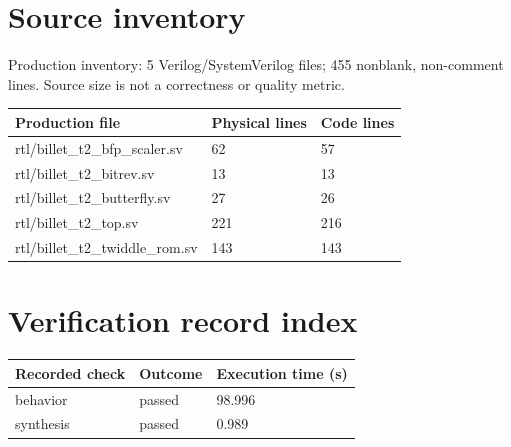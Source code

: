 \documentclass[11pt,a4paper]{article}
\begin{document}
\appendix\section{Source inventory}

Production inventory: 5 Verilog/\allowbreak{}SystemVerilog files; 455 nonblank,\allowbreak{} non-comment lines. Source size is not a correctness or quality metric.

{\small\renewcommand{\arraystretch}{1.18}\begin{longtable}{@{}L{0.61\textwidth}L{0.15\textwidth}L{0.15\textwidth}@{}}\toprule

\textbf{Production file} & \textbf{Physical lines} & \textbf{Code lines}\\\midrule\endhead

rtl/\allowbreak{}billet\_\allowbreak{}t2\_\allowbreak{}bfp\_\allowbreak{}scaler.sv & 62 & 57\\[3pt]

rtl/\allowbreak{}billet\_\allowbreak{}t2\_\allowbreak{}bitrev.sv & 13 & 13\\[3pt]

rtl/\allowbreak{}billet\_\allowbreak{}t2\_\allowbreak{}butterfly.sv & 27 & 26\\[3pt]

rtl/\allowbreak{}billet\_\allowbreak{}t2\_\allowbreak{}top.sv & 221 & 216\\[3pt]

rtl/\allowbreak{}billet\_\allowbreak{}t2\_\allowbreak{}twiddle\_\allowbreak{}rom.sv & 143 & 143\\[3pt]

\bottomrule\end{longtable}}

\section{Verification record index}

{\small\renewcommand{\arraystretch}{1.18}\begin{longtable}{@{}L{0.57\textwidth}L{0.16\textwidth}L{0.17\textwidth}@{}}\toprule

\textbf{Recorded check} & \textbf{Outcome} & \textbf{Execution time (\allowbreak{}s)\allowbreak{}}\\\midrule\endhead

behavior & passed & 98.996\\[3pt]

synthesis & passed & 0.989\\[3pt]

\bottomrule\end{longtable}}
\end{document}

